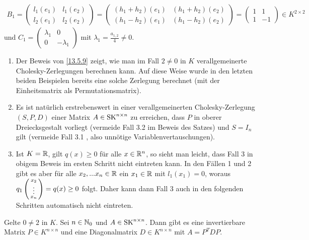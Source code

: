\documentclass[../../main.tex]{subfiles}
\begin{document}
\begin{cproof}
\begin{align*}
B_1=\begin{pmatrix*}l_1(e_1) & l_1(e_2)\\ l_2(e_1) & l_2(e_2)\end{pmatrix*}=\begin{pmatrix*}(h_1+h_2)(e_1) & (h_1+h_2)(e_2)\\ (h_1-h_2)(e_1) & (h_1-h_2)(e_2)\end{pmatrix*}=\begin{pmatrix} 1 & 1 \\ 1 &  -1\end{pmatrix}\in K^{2\times 2}
\end{align*}
und $C_1=\begin{pmatrix}\lambda_1 & 0\\ 0 & -\lambda_1\end{pmatrix}$ mit $\lambda_1=\frac{a_{1,2}}{4}\neq 0$.
\end{cproof}

\begin{bem}\label{13.5.10}
\begin{enumerate}[\normalfont(a)]
\item Der Beweis von \ref{13.5.9} zeigt, wie man im Fall $2\neq 0$ in $K$ verallgemeinerte Cholesky-Zerlegungen berechnen kann. Auf diese Weise wurde in den letzten beiden Beispielen bereits eine solche Zerlegung berechnet (mit der Einheitsmatrix als Permutationsmatrix).
\item Es ist natürlich erstrebenswert in einer verallgemeinerten Cholesky-Zerlegung $(S,P,D)$ einer Matrix $A\in \operatorname{SK}^{n\times n}$ zu erreichen, dass $P$ in oberer Dreiecksgestalt vorliegt (vermeide Fall 3.2 im Beweis des Satzes) und $S=I_n$ gilt (vermeide Fall 3.1 , also unnötige Variablenvertauschungen).
\item Ist $K=\mathbb R$, gilt $q(x)\ge 0$ für alle $x\in \mathbb R^n$, so sieht man leicht, dass Fall 3 in obigem Beweis im ersten Schritt nicht eintreten kann. In den Fällen 1 und 2 gibt es aber für alle $x_2,...x_n\in \mathbb R$  ein $x_1\in \mathbb R$ mit $l_1(x_1)=0$, woraus $q_1\left(\begin{smallmatrix}x_2\\\vdots\\x_n\end{smallmatrix}\right)=q(x)\ge 0$ folgt. Daher kann dann Fall 3 auch in den folgenden Schritten automatisch nicht eintreten.
\end{enumerate}
\end{bem}

\begin{kor}\label{13.5.11}
Gelte $0\neq 2$ in $K$. Sei $n\in \mathbb N_0$ und $A\in \operatorname{SK}^{n\times n}$. Dann gibt es eine invertierbare Matrix $P\in K^{n\times n}$ und eine Diagonalmatrix $D\in K^{n\times n}$ mit $A=P^TDP$.
\end{kor}
	
\end{document}
